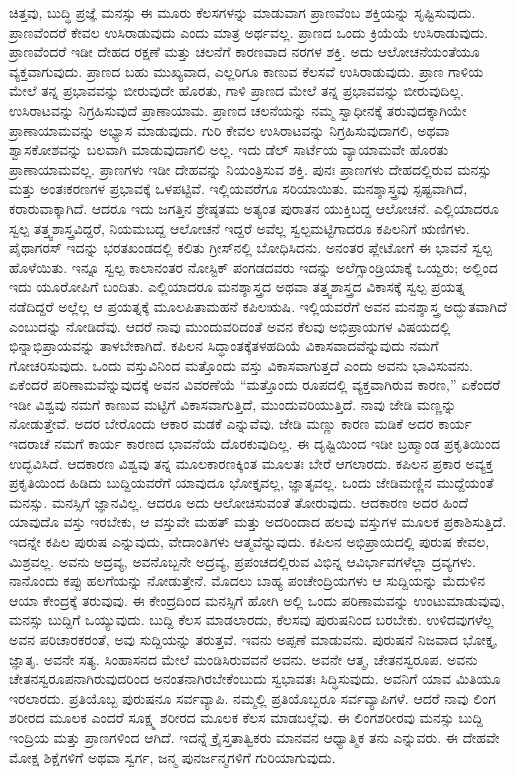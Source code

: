 ಚಿತ್ತವು, ಬುದ್ಧಿ ಪ್ರಜ್ಞೆ ಮನಸ್ಸು ಈ ಮೂರು ಕೆಲಸಗಳನ್ನು ಮಾಡುವಾಗ ಪ್ರಾಣವೆಂಬ ಶಕ್ತಿಯನ್ನು ಸೃಷ್ಟಿಸುವುದು. ಪ್ರಾಣವೆಂದರೆ ಕೇವಲ ಉಸಿರಾಡುವುದು ಎಂದು ಮಾತ್ರ ಅರ್ಥವಲ್ಲ. ಪ್ರಾಣದ ಒಂದು ಕ್ರಿಯೆಯೆ ಉಸಿರಾಡುವುದು. ಪ್ರಾಣವೆಂದರೆ ಇಡೀ ದೇಹದ ರಕ್ಷಣೆ ಮತ್ತು ಚಲನೆಗೆ ಕಾರಣವಾದ ನರಗಳ ಶಕ್ತಿ. ಅದು ಆಲೋಚನೆಯಂತೆಯೂ ವ್ಯಕ್ತವಾಗುವುದು. ಪ್ರಾಣದ ಬಹು ಮುಖ್ಯವಾದ, ಎಲ್ಲರಿಗೂ ಕಾಣುವ ಕೆಲಸವೆ ಉಸಿರಾಡುವುದು. ಪ್ರಾಣ ಗಾಳಿಯ ಮೇಲೆ ತನ್ನ ಪ್ರಭಾವವನ್ನು ಬೀರುವುದೇ ಹೊರತು, ಗಾಳಿ ಪ್ರಾಣದ ಮೇಲೆ ತನ್ನ ಪ್ರಭಾವವನ್ನು ಬೀರುವುದಿಲ್ಲ. ಉಸಿರಾಟವನ್ನು ನಿಗ್ರಹಿಸುವುದೆ ಪ್ರಾಣಾಯಾಮ. ಪ್ರಾಣದ ಚಲನೆಯನ್ನು ನಮ್ಮ ಸ್ವಾಧೀನಕ್ಕೆ ತರುವುದಕ್ಕಾಗಿಯೇ ಪ್ರಾಣಾಯಾಮವನ್ನು ಅಭ್ಯಾಸ ಮಾಡುವುದು. ಗುರಿ ಕೇವಲ ಉಸಿರಾಟವನ್ನು ನಿಗ್ರಹಿಸುವುದಾಗಲಿ, ಅಥವಾ ಶ್ವಾಸಕೋಶವನ್ನು ಬಲವಾಗಿ ಮಾಡುವುದಾಗಲಿ ಅಲ್ಲ. ಇದು ಡೆಲ್ ಸಾರ್ಟೆಯ ವ್ಯಾಯಾಮವೇ ಹೊರತು ಪ್ರಾಣಾಯಾಮವಲ್ಲ. ಪ್ರಾಣಗಳು ಇಡೀ ದೇಹವನ್ನು ನಿಯಂತ್ರಿಸುವ ಶಕ್ತಿ. ಪುನಃ ಪ್ರಾಣಗಳು ದೇಹದಲ್ಲಿರುವ ಮನಸ್ಸು ಮತ್ತು ಅಂತಃಕರಣಗಳ ಪ್ರಭಾವಕ್ಕೆ ಒಳಪಟ್ಟಿವೆ. ಇಲ್ಲಿಯವರೆಗೂ ಸರಿಯಾಯಿತು. ಮನಶ್ಶಾಸ್ತ್ರವು ಸ್ಪಷ್ಟವಾಗಿದೆ, ಕರಾರುವಾಕ್ಕಾಗಿದೆ. ಆದರೂ ಇದು ಜಗತ್ತಿನ ಶ್ರೇಷ್ಠತಮ ಅತ್ಯಂತ ಪುರಾತನ ಯುಕ್ತಿಬದ್ದ ಆಲೋಚನೆ. ಎಲ್ಲಿಯಾದರೂ ಸ್ವಲ್ಪ ತತ್ತ್ವಶಾಸ್ತ್ರವಿದ್ದರೆ, ನಿಯಮಬದ್ದ ಆಲೋಚನೆ ಇದ್ದರೆ ಅವೆಲ್ಲ ಸ್ವಲ್ಪಮಟ್ಟಿಗಾದರೂ ಕಪಿಲನಿಗೆ ಋಣಿಗಳು. ಪೈಥಾಗರಸ್ ಇದನ್ನು ಭರತಖಂಡದಲ್ಲಿ ಕಲಿತು ಗ್ರೀಸ್‌ನಲ್ಲಿ ಬೋಧಿಸಿದನು. ಅನಂತರ ಪ್ಲೇಟೋಗೆ ಈ ಭಾವನೆ ಸ್ವಲ್ಪ ಹೊಳೆಯಿತು. ಇನ್ನೂ ಸ್ವಲ್ಪ ಕಾಲಾನಂತರ ನೋಸ್ಟಿಕ್ ಪಂಗಡದವರು ಇದನ್ನು ಅಲೆಗ್ಸಾಂಡ್ರಿಯಾಕ್ಕೆ ಒಯ್ದರು; ಅಲ್ಲಿಂದ ಇದು ಯೂರೋಪಿಗೆ ಬಂದಿತು. ಎಲ್ಲಿಯಾದರೂ ಮನಶ್ಶಾಸ್ತ್ರದ ಅಥವಾ ತತ್ತ್ವಶಾಸ್ತ್ರದ ವಿಕಾಸಕ್ಕೆ ಸ್ವಲ್ಪ ಪ್ರಯತ್ನ ನಡೆದಿದ್ದರೆ ಅಲ್ಲೆಲ್ಲ ಆ ಪ್ರಯತ್ನಕ್ಕೆ ಮೂಲಪಿತಾಮಹನೆ ಕಪಿಲಋಷಿ. ಇಲ್ಲಿಯವರೆಗೆ ಅವನ ಮನಶ್ಶಾಸ್ತ್ರ ಅದ್ಭುತವಾಗಿದೆ ಎಂಬುದನ್ನು ನೋಡಿದೆವು. ಆದರೆ ನಾವು ಮುಂದುವರಿದಂತೆ ಅವನ ಕೆಲವು ಅಭಿಪ್ರಾಯ\-ಗಳ ವಿಷಯದಲ್ಲಿ ಭಿನ್ನಾಭಿಪ್ರಾಯವನ್ನು ತಾಳಬೇಕಾಗಿದೆ. ಕಪಿಲನ ಸಿದ್ಧಾಂತಕ್ಕೆ\break ತಳಹದಿಯೆ ವಿಕಾಸವಾದವೆನ್ನುವುದು ನಮಗೆ ಗೋಚರಿಸುವುದು. ಒಂದು ವಸ್ತುವಿನಿಂದ ಮತ್ತೊಂದು ವಸ್ತು ವಿಕಾಸವಾಗುತ್ತದೆ ಎಂದು ಅವನು ಭಾವಿಸುವನು. ಏಕೆಂದರೆ ಪರಿಣಾಮವೆನ್ನುವುದಕ್ಕೆ ಅವನ ವಿವರಣೆಯೆ “ಮತ್ತೊಂದು ರೂಪದಲ್ಲಿ ವ್ಯಕ್ತವಾಗಿರುವ ಕಾರಣ,'' ಏಕೆಂದರೆ ಇಡೀ ವಿಶ್ವವು ನಮಗೆ ಕಾಣುವ ಮಟ್ಟಿಗೆ ವಿಕಾಸವಾಗುತ್ತಿದೆ, ಮುಂದುವರಿಯುತ್ತಿದೆ. ನಾವು ಜೇಡಿ ಮಣ್ಣನ್ನು ನೋಡುತ್ತೇವೆ. ಅದರ ಬೇರೊಂದು ಆಕಾರ ಮಡಕೆ ಎನ್ನುವೆವು. ಜೇಡಿ ಮಣ್ಣು ಕಾರಣ ಮಡಿಕೆ ಅದರ ಕಾರ್ಯ ಇದರಾಚೆ ನಮಗೆ ಕಾರ್ಯ ಕಾರಣದ ಭಾವನೆಯೆ ದೊರಕುವುದಿಲ್ಲ. ಈ ದೃಷ್ಟಿಯಿಂದ ಇಡೀ ಬ್ರಹ್ಮಾಂಡ ಪ್ರಕೃತಿಯಿಂದ ಉದ್ಭವಿಸಿದೆ. ಆದಕಾರಣ ವಿಶ್ವವು ತನ್ನ ಮೂಲಕಾರಣಕ್ಕಿಂತ ಮೂಲತಃ ಬೇರೆ ಆಗಲಾರದು. ಕಪಿಲನ ಪ್ರಕಾರ ಅವ್ಯಕ್ತ ಪ್ರಕೃತಿಯಿಂದ ಹಿಡಿದು ಬುದ್ದಿಯವರೆಗೆ ಯಾವುದೂ ಭೋಕ್ತೃವಲ್ಲ, ಜ್ಞಾತೃವಲ್ಲ. ಒಂದು ಜೇಡಿಮಣ್ಣಿನ ಮುದ್ದೆಯಂತೆ ಮನಸ್ಸು. ಮನಸ್ಸಿಗೆ ಜ್ಞಾನವಿಲ್ಲ. ಆದರೂ ಅದು ಆಲೋಚಿಸುವಂತೆ ತೋರುವುದು. ಆದಕಾರಣ ಅದರ ಹಿಂದೆ ಯಾವುದೊ ವಸ್ತು ಇರಬೇಕು, ಆ ವಸ್ತುವೇ ಮಹತ್ ಮತ್ತು ಅದರಿಂದಾದ ಹಲವು ವಸ್ತುಗಳ ಮೂಲಕ ಪ್ರಕಾಶಿಸುತ್ತಿದೆ. ಇದನ್ನೇ ಕಪಿಲ ಪುರುಷ ಎನ್ನುವುದು, ವೇದಾಂತಿಗಳು ಆತ್ಮವೆನ್ನುವುದು. ಕಪಿಲನ ಅಭಿಪ್ರಾಯದಲ್ಲಿ ಪುರುಷ ಕೇವಲ, ಮಿಶ್ರವಲ್ಲ. ಅವನು ಅದ್ರವ್ಯ, ಅವನೊಬ್ಬನೇ ಅದ್ರವ್ಯ, ಪ್ರಪಂಚದಲ್ಲಿರುವ ವಿಭಿನ್ನ ಆವಿರ್ಭಾವಗಳೆಲ್ಲಾ ದ್ರವ್ಯಗಳು. ನಾನೊಂದು ಕಪ್ಪು ಹಲಗೆಯನ್ನು ನೋಡುತ್ತೇನೆ. ಮೊದಲು ಬಾಹ್ಯ ಪಂಚೇಂದ್ರಿಯಗಳು ಆ ಸುದ್ದಿಯನ್ನು ಮೆದುಳಿನ ಆಯಾ ಕೇಂದ್ರಕ್ಕೆ ತರುವುವು. ಈ ಕೇಂದ್ರದಿಂದ ಮನಸ್ಸಿಗೆ ಹೋಗಿ ಅಲ್ಲಿ ಒಂದು ಪರಿಣಾಮವನ್ನು ಉಂಟುಮಾಡುವುವು, ಮನಸ್ಸು ಬುದ್ದಿಗೆ ಒಯ್ಯುವುದು. ಬುದ್ದಿ ಕೆಲಸ ಮಾಡಲಾರದು, ಕೆಲಸವು ಪುರುಷನಿಂದ ಬರಬೇಕು. ಉಳಿದವುಗಳೆಲ್ಲ ಅವನ ಪರಿಚಾರಕರಂತೆ, ಅವು ಸುದ್ದಿಯನ್ನು ತರುತ್ತವೆ. ಇವನು ಅಪ್ಪಣೆ ಮಾಡುವನು. ಪುರುಷನೆ ನಿಜವಾದ ಭೋಕ್ತೃ, ಜ್ಞಾತೃ. ಅವನೇ ಸತ್ಯ. ಸಿಂಹಾಸನದ ಮೇಲೆ ಮಂಡಿಸಿರುವವನೆ ಅವನು. ಅವನೇ ಆತ್ಮ, ಚೇತನಸ್ವರೂಪ. ಅವನು ಚೇತನಸ್ವರೂಪನಾಗಿರುವುದರಿಂದ ಅನಂತನಾಗಿರಬೇಕೆಂಬುದು ಸ್ವಭಾವತಃ ಸಿದ್ಧಿಸುವುದು. ಅವನಿಗೆ ಯಾವ ಮಿತಿಯೂ ಇರಲಾರದು. ಪ್ರತಿಯೊಬ್ಬ ಪುರುಷನೂ ಸರ್ವವ್ಯಾಪಿ. ನಮ್ಮಲ್ಲಿ ಪ್ರತಿಯೊಬ್ಬರೂ ಸರ್ವವ್ಯಾಪಿಗಳೆ. ಆದರೆ ನಾವು ಲಿಂಗ ಶರೀರದ ಮೂಲಕ ಎಂದರೆ ಸೂಕ್ಷ್ಮ ಶರೀರದ ಮೂಲಕ ಕೆಲಸ ಮಾಡಬಲ್ಲೆವು. ಈ ಲಿಂಗಶರೀರವು ಮನಸ್ಸು ಬುದ್ದಿ ಇಂದ್ರಿಯ ಮತ್ತು ಪ್ರಾಣಗಳಿಂದ ಆಗಿದೆ. ಇದನ್ನೆ ಕ್ರೈಸ್ತತಾತ್ವಿಕರು ಮಾನವನ ಆಧ್ಯಾತ್ಮಿಕ ತನು ಎನ್ನುವರು. ಈ ದೇಹವೇ ಮೋಕ್ಷ ಶಿಕ್ಷೆಗಳಿಗೆ ಅಥವಾ ಸ್ವರ್ಗ, ಜನ್ಮ ಪುನರ್ಜನ್ಮಗಳಿಗೆ ಗುರಿಯಾಗುವುದು. 